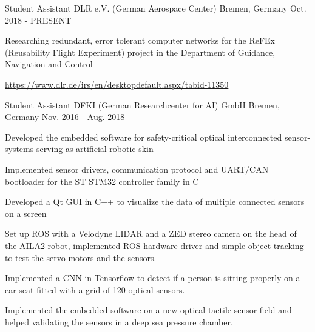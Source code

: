 

\begin{cventries}

  \cventry
    {Student Assistant} %
    {DLR e.V. (German Aerospace Center)} %
    {Bremen, Germany} %
    {Oct. 2018 - PRESENT} %
    {
      \begin{cvitems} %
        \item {Researching redundant, error tolerant computer networks for the ReFEx (Reusability Flight Experiment) project in the Department of Guidance, Navigation and Control}
        \item {\url{https://www.dlr.de/irs/en/desktopdefault.aspx/tabid-11350}}
      \end{cvitems}
    }
    
  \cventry
    {Student Assistant} %
    {DFKI (German Researchcenter for AI) GmbH} %
    {Bremen, Germany} %
    {Nov. 2016 - Aug. 2018} %
    {
      \begin{cvitems} %
        \item {Developed the embedded software for safety-critical optical interconnected sensor-systems serving as artificial robotic skin}
        \item {Implemented sensor drivers, communication protocol and UART/CAN bootloader for the ST STM32 controller family in C}
        \item {Developed a Qt GUI in C++ to visualize the data of multiple connected sensors on a screen}
        \item {Set up ROS with a Velodyne LIDAR and a ZED stereo camera on the head of the AILA2 robot, implemented ROS hardware driver and simple object tracking to test the servo motors and the sensors.}
        \item {Implemented a CNN in Tensorflow to detect if a person is sitting properly on a car seat fitted with a grid of 120 optical sensors.}
        \item {Implemented the embedded software on a new optical tactile sensor field and helped validating the sensors in a deep sea pressure chamber.}
      \end{cvitems}
    }


\end{cventries}
